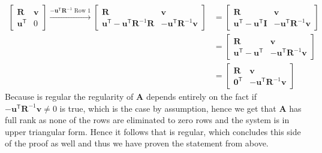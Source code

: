 \documentclass{article}
\begin{document}
\begin{align*}
    \begin{bmatrix}
        \mathbf{R} & \mathbf{v} \\
        \mathbf{u}^{\mathsf{T}}&  0
    \end{bmatrix}
    \overset{-\mathbf{u}^{\mathsf{T}}\mathbf{R}^{-1}\text{ Row $1$}}{\longrightarrow}
    \begin{bmatrix}
        \mathbf{R} & \mathbf{v} \\
        \mathbf{u}^{\mathsf{T}} - \mathbf{u}^{\mathsf{T}}\mathbf{R}^{-1}\mathbf{R} & 
        - \mathbf{u}^{\mathsf{T}}\mathbf{R}^{-1}\mathbf{v}
    \end{bmatrix} &=  
    \begin{bmatrix}
        \mathbf{R} & \mathbf{v} \\
        \mathbf{u}^{\mathsf{T}} - \mathbf{u}^{\mathsf{T}}\mathbf{I} & 
        - \mathbf{u}^{\mathsf{T}}\mathbf{R}^{-1}\mathbf{v}
    \end{bmatrix} \\
    &= 
    \begin{bmatrix}
        \mathbf{R} & \mathbf{v} \\
        \mathbf{u}^{\mathsf{T}} - \mathbf{u}^{\mathsf{T}}& 
        - \mathbf{u}^{\mathsf{T}}\mathbf{R}^{-1}\mathbf{v}
    \end{bmatrix} \\
    &= 
    \begin{bmatrix}
        \mathbf{R} & \mathbf{v} \\
        \mathbf{0}^{\mathsf{T}}& 
        - \mathbf{u}^{\mathsf{T}}\mathbf{R}^{-1}\mathbf{v}
    \end{bmatrix}
\end{align*}
Because  is regular the regularity of $\mathbf{A}$ depends entirely on the fact if $- \mathbf{u}^{\mathsf{T}}\mathbf{R}^{-1}\mathbf{v} \neq 0$ is true, which is the case by assumption, hence we get that $\mathbf{A}$ has full rank as none of the rows are eliminated to zero rows and the system is in upper triangular form. Hence it follows that  is regular, which concludes this side of the proof as well and thus we have proven the statement from above.
\end{document}
